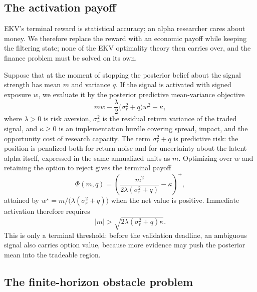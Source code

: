 \documentclass[11pt]{article}
\begin{document}
\subsection{The activation payoff}

EKV's terminal reward is statistical accuracy; an alpha researcher cares about money.
We therefore replace the reward with an economic payoff while keeping the filtering
state; none of the EKV optimality theory then carries over, and the finance problem
must be solved on its own.

Suppose that at the moment of stopping the posterior belief about the signal strength
has mean $m$ and variance $q$.  If the signal is activated with signed exposure $w$, we
evaluate it by the posterior predictive mean-variance objective
\begin{equation}
    m w-\frac{\lambda}{2}\bigl(\sigma_r^2+q\bigr)w^2-\kappa,
    \label{eq:activation_objective}
\end{equation}
where $\lambda>0$ is risk aversion, $\sigma_r^2$ is the residual return variance of the
traded signal, and $\kappa\ge0$ is an implementation hurdle covering spread, impact,
and the opportunity cost of research capacity.  The term $\sigma_r^2+q$ is predictive
risk: the position is penalized both for return noise and for uncertainty about the
latent alpha itself, expressed in the same annualized units as $m$.  Optimizing over
$w$ and retaining the option to reject gives the terminal payoff
\begin{equation}
    \Phi(m,q)
    =
    \left(\frac{m^2}{2\lambda(\sigma_r^2+q)}-\kappa\right)^{\!+},
    \label{eq:tradeability_payoff}
\end{equation}
attained by $w^\star=m/\bigl(\lambda(\sigma_r^2+q)\bigr)$ when the net value is
positive.  Immediate activation therefore requires
\begin{equation}
    |m|>\sqrt{2\lambda(\sigma_r^2+q)\kappa}.
    \label{eq:activation_threshold}
\end{equation}
This is only a terminal threshold: before the validation deadline, an ambiguous signal
also carries option value, because more evidence may push the posterior mean into the
tradeable region.

\subsection{The finite-horizon obstacle problem}
\label{sec:vi}
\end{document}
